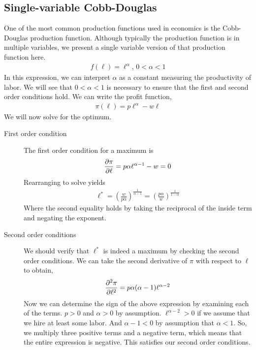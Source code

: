 \subsection{Single-variable Cobb-Douglas}
One of the most common production functions used in economics is the Cobb-Douglas production function. Although typically the production function is in multiple variables, we present a single variable version of that production function here. 
\begin{align}
    f(\ell) = \ell^\alpha, \, 0 < \alpha < 1 
\end{align}
In this expression, we can interpret $\alpha$ as a constant measuring the productivity of labor. We will see that $0 < \alpha < 1$ is necessary to ensure that the first and second order conditions hold. We can write the profit function,
\begin{align}
    \pi(\ell) = p \ell^\alpha - w \ell
\end{align}
We will now solve for the optimum.
\begin{description}
    \item[First order condition] The first order condition for a maximum is
    \begin{align}
        \frac{\partial \pi}{\partial \ell} = p \alpha \ell^{\alpha - 1} - w = 0
    \end{align} 
    Rearranging to solve yields
    \begin{align}
        \ell^* = \left(\frac{w}{p \alpha}\right)^{\frac{1}{\alpha - 1}} = \left(\frac{p \alpha}{w}\right)^{\frac{1}{1 - \alpha}} \label{eq:cobb_douglas_optimized}
    \end{align}
    Where the second equality holds by taking the reciprocal of the inside term and negating the exponent. 
    \item[Second order conditions] We should verify that $\ell^*$ is indeed a maximum by checking the second order conditions. We can take the second derivative of $\pi$ with respect to $\ell$ to obtain,
    \begin{align}
        \frac{\partial ^2 \pi}{\partial \ell^2} = p \alpha (\alpha - 1) \ell^{\alpha - 2}
    \end{align}
    Now we can determine the sign of the above expression by examining each of the terms. $p > 0$ and $\alpha > 0$ by assumption. $\ell^{\alpha - 2} > 0$ if we assume that we hire at least some labor. And $\alpha - 1 < 0$ by assumption that $\alpha < 1$. So, we multiply three positive terms and a negative term, which means that the entire expression is negative. This satisfies our second order conditions. 
\end{description}

